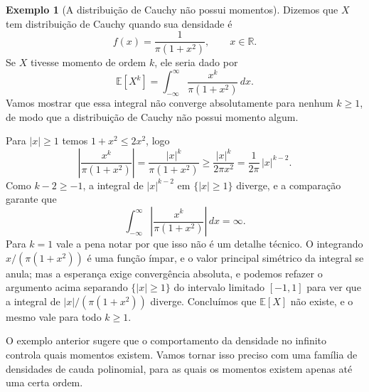 \documentclass[12pt,portuguese]{article}
\theoremstyle{definition}
\newtheorem{example}[example]{Exemplo}
\theoremstyle{plainexercise}
\theoremstyle{starredexercise}
\theoremstyle{definition}
\begin{document}
\begin{example}[A distribuição de Cauchy não possui momentos]\label{ex:momento-cauchy}
Dizemos que $X$ tem distribuição de Cauchy quando sua densidade é
\[
f(x)=\frac{1}{\pi(1+x^2)},\qquad x\in\mathbb{R}.
\]
Se $X$ tivesse momento de ordem $k$, ele seria dado por
\[
\mathbb{E}[X^k]=\int_{-\infty}^{\infty}\frac{x^k}{\pi(1+x^2)}\,dx .
\]
Vamos mostrar que essa integral não converge absolutamente para nenhum
$k\geqslant 1$, de modo que a distribuição de Cauchy não possui momento algum.

Para $|x|\geqslant 1$ temos $1+x^2\leqslant 2x^2$, logo
\[
\left|\frac{x^k}{\pi(1+x^2)}\right|
= \frac{|x|^k}{\pi(1+x^2)}
\geqslant \frac{|x|^k}{2\pi x^2}
= \frac{1}{2\pi}\,|x|^{k-2}.
\]
Como $k-2\geqslant -1$, a integral de $|x|^{k-2}$ em $\{|x|\geqslant 1\}$
diverge, e a comparação garante que
\[
\int_{-\infty}^{\infty}\left|\frac{x^k}{\pi(1+x^2)}\right|\,dx=\infty.
\]
Para $k=1$ vale a pena notar por que isso não é um detalhe técnico. O
integrando $x/(\pi(1+x^2))$ é uma função ímpar, e o valor principal simétrico
da integral se anula; mas a esperança exige convergência absoluta, e podemos
refazer o argumento acima separando $\{|x|\geqslant 1\}$ do intervalo limitado
$[-1,1]$ para ver que a integral de $|x|/(\pi(1+x^2))$ diverge. Concluímos que
$\mathbb{E}[X]$ não existe, e o mesmo vale para todo $k\geqslant 1$.
\end{example}

O exemplo anterior sugere que o comportamento da densidade no infinito controla
quais momentos existem. Vamos tornar isso preciso com uma família de densidades
de cauda polinomial, para as quais os momentos existem apenas até uma certa
ordem.
\end{document}
